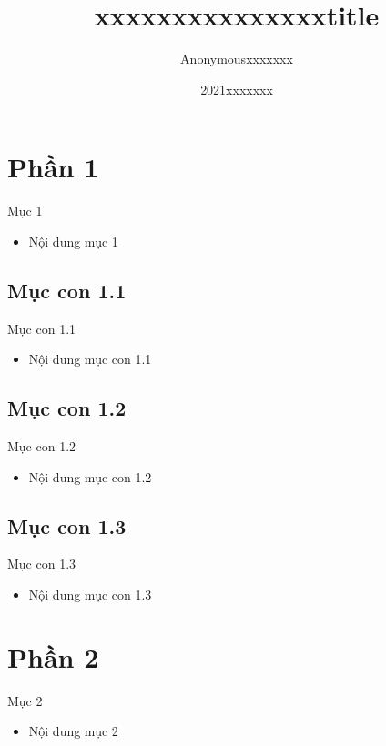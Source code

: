 \documentclass{beamer}
\title{xxxxxxxxxxxxxxxtitle}
\author{Anonymousxxxxxxx}
\institute{Overleafxxxxxxx}
\date{2021xxxxxxx}
\begin{document}


\frame{\titlepage}

\frame{\tableofcontents}




\section{Phần 1}
\begin{frame}{Mục 1}
\begin{itemize}
\item Nội dung mục 1
\end{itemize}
\end{frame}

\subsection{Mục con 1.1}
\begin{frame}{Mục con 1.1}
\begin{itemize}
\item Nội dung mục con 1.1
\end{itemize}
\end{frame}

\subsection{Mục con 1.2}
\begin{frame}{Mục con 1.2}
\begin{itemize}
\item Nội dung mục con 1.2
\end{itemize}
\end{frame}

\subsection{Mục con 1.3}
\begin{frame}{Mục con 1.3}
\begin{itemize}
\item Nội dung mục con 1.3
\end{itemize}
\end{frame}

\section{Phần 2}
\begin{frame}{Mục 2}
\begin{itemize}
\item Nội dung mục 2
\end{itemize}
\end{frame}
\end{document}
